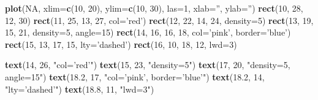 \documentclass[10pt,]{krantz}
\makeatletter
\newenvironment{Shaded}{\begin{snugshade}}{\end{snugshade}}
\newcommand{\KeywordTok}[1]{\textcolor[rgb]{0.13,0.29,0.53}{\textbf{{#1}}}}
\newcommand{\DataTypeTok}[1]{\textcolor[rgb]{0.13,0.29,0.53}{{#1}}}
\newcommand{\DecValTok}[1]{\textcolor[rgb]{0.00,0.00,0.81}{{#1}}}
\newcommand{\FloatTok}[1]{\textcolor[rgb]{0.00,0.00,0.81}{{#1}}}
\newcommand{\StringTok}[1]{\textcolor[rgb]{0.31,0.60,0.02}{{#1}}}
\newcommand{\OtherTok}[1]{\textcolor[rgb]{0.56,0.35,0.01}{{#1}}}
\newcommand{\NormalTok}[1]{{#1}}
\newenvironment{kframe}{%
\medskip{}
\setlength{\fboxsep}{.8em}
 \def\at@end@of@kframe{}%
 \ifinner\ifhmode%
  \def\at@end@of@kframe{\end{minipage}}%
  \begin{minipage}{\columnwidth}%
 \fi\fi%
 \def\FrameCommand##1{\hskip\@totalleftmargin \hskip-\fboxsep
 \colorbox{shadecolor}{##1}\hskip-\fboxsep
     \hskip-\linewidth \hskip-\@totalleftmargin \hskip\columnwidth}%
 \MakeFramed {\advance\hsize-\width
   \@totalleftmargin\z@ \linewidth\hsize
   \@setminipage}}%
 {\par\unskip\endMakeFramed%
 \at@end@of@kframe}
\renewenvironment{Shaded}{\begin{kframe}}{\end{kframe}}
\makeatother
\begin{document}
\begin{Shaded}
\begin{Highlighting}[]
\KeywordTok{plot}\NormalTok{(}\OtherTok{NA}\NormalTok{, }\DataTypeTok{xlim=}\KeywordTok{c}\NormalTok{(}\DecValTok{10}\NormalTok{, }\DecValTok{20}\NormalTok{), }\DataTypeTok{ylim=}\KeywordTok{c}\NormalTok{(}\DecValTok{10}\NormalTok{, }\DecValTok{30}\NormalTok{), }\DataTypeTok{las=}\DecValTok{1}\NormalTok{, }\DataTypeTok{xlab=}\StringTok{''}\NormalTok{, }\DataTypeTok{ylab=}\StringTok{''}\NormalTok{)}
\KeywordTok{rect}\NormalTok{(}\DecValTok{10}\NormalTok{, }\DecValTok{28}\NormalTok{, }\DecValTok{12}\NormalTok{, }\DecValTok{30}\NormalTok{)}
\KeywordTok{rect}\NormalTok{(}\DecValTok{11}\NormalTok{, }\DecValTok{25}\NormalTok{, }\DecValTok{13}\NormalTok{, }\DecValTok{27}\NormalTok{, }\DataTypeTok{col=}\StringTok{'red'}\NormalTok{)}
\KeywordTok{rect}\NormalTok{(}\DecValTok{12}\NormalTok{, }\DecValTok{22}\NormalTok{, }\DecValTok{14}\NormalTok{, }\DecValTok{24}\NormalTok{, }\DataTypeTok{density=}\DecValTok{5}\NormalTok{)}
\KeywordTok{rect}\NormalTok{(}\DecValTok{13}\NormalTok{, }\DecValTok{19}\NormalTok{, }\DecValTok{15}\NormalTok{, }\DecValTok{21}\NormalTok{, }\DataTypeTok{density=}\DecValTok{5}\NormalTok{, }\DataTypeTok{angle=}\DecValTok{15}\NormalTok{)}
\KeywordTok{rect}\NormalTok{(}\DecValTok{14}\NormalTok{, }\DecValTok{16}\NormalTok{, }\DecValTok{16}\NormalTok{, }\DecValTok{18}\NormalTok{, }\DataTypeTok{col=}\StringTok{'pink'}\NormalTok{, }\DataTypeTok{border=}\StringTok{'blue'}\NormalTok{)}
\KeywordTok{rect}\NormalTok{(}\DecValTok{15}\NormalTok{, }\DecValTok{13}\NormalTok{, }\DecValTok{17}\NormalTok{, }\DecValTok{15}\NormalTok{, }\DataTypeTok{lty=}\StringTok{'dashed'}\NormalTok{)}
\KeywordTok{rect}\NormalTok{(}\DecValTok{16}\NormalTok{, }\DecValTok{10}\NormalTok{, }\DecValTok{18}\NormalTok{, }\DecValTok{12}\NormalTok{, }\DataTypeTok{lwd=}\DecValTok{3}\NormalTok{)}

\KeywordTok{text}\NormalTok{(}\DecValTok{14}\NormalTok{, }\DecValTok{26}\NormalTok{, }\StringTok{"col='red'"}\NormalTok{)}
\KeywordTok{text}\NormalTok{(}\DecValTok{15}\NormalTok{, }\DecValTok{23}\NormalTok{, }\StringTok{"density=5"}\NormalTok{)}
\KeywordTok{text}\NormalTok{(}\DecValTok{17}\NormalTok{, }\DecValTok{20}\NormalTok{, }\StringTok{"density=5, angle=15"}\NormalTok{)}
\KeywordTok{text}\NormalTok{(}\FloatTok{18.2}\NormalTok{, }\DecValTok{17}\NormalTok{, }\StringTok{"col='pink', border='blue'"}\NormalTok{)}
\KeywordTok{text}\NormalTok{(}\FloatTok{18.2}\NormalTok{, }\DecValTok{14}\NormalTok{, }\StringTok{"lty='dashed'"}\NormalTok{)}
\KeywordTok{text}\NormalTok{(}\FloatTok{18.8}\NormalTok{, }\DecValTok{11}\NormalTok{, }\StringTok{"lwd=3"}\NormalTok{)}
\end{Highlighting}
\end{Shaded}
\end{document}
